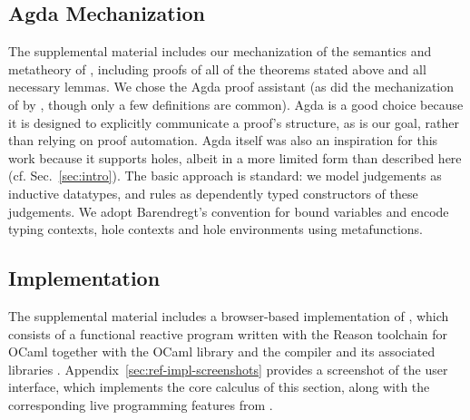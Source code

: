 

\subsection{Agda Mechanization}
\label{sec:agda-mechanization}
\vspace{-3px}

The supplemental material includes our mechanization of the semantics and metatheory of \HazelnutLive, 
including proofs of all of the theorems stated above and all necessary lemmas. 
%
We chose the Agda proof assistant \cite{norell2009dependently,norell:thesis} 
(as did the mechanization of \Hazelnut by \citet{popl-paper}, though only a few definitions are common). 
%
Agda is a good choice because it is designed to explicitly communicate a proof's structure, as is our goal, rather than relying on proof automation. 
%
Agda itself was also an inspiration for this work because it supports holes, albeit in a more limited form than described here (cf. Sec.~\ref{sec:intro}). 
%
The basic approach is standard: we model judgements as 
inductive datatypes, and rules as dependently typed constructors of these judgements. 
%
We adopt Barendregt's convention for bound variables \cite{urban,barendregt84:_lambda_calculus} and encode typing 
contexts, hole contexts and hole environments using metafunctions.

\subsection{Implementation}\label{sec:implementation}

The supplemental material includes a browser-based implementation
of \HazelnutLive, which consists of a functional reactive program
%
%
%
written with the Reason toolchain for OCaml \cite{reason-what,leroy03:_ocaml} 
together with the OCaml  library \cite{OcamlReact} 
and the  compiler and its associated libraries \cite{vouillon2014bytecode}. 
%
Appendix~\ref{sec:ref-impl-screenshots} provides a screenshot of the user interface, 
which implements the core calculus of this section, 
along with the corresponding live programming features from .


